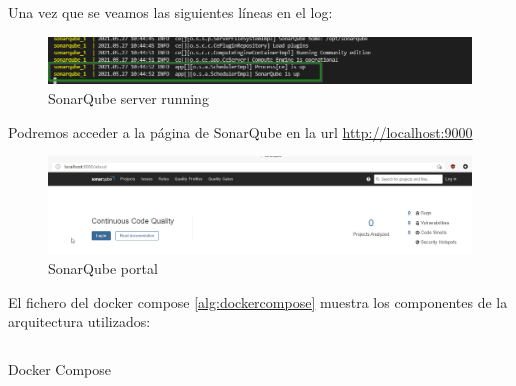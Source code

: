 \newpage
Una vez que se veamos las siguientes líneas en el log:\\
\begin{figure}[!htb] 
    \captionsetup{width=1\linewidth}   
    \includegraphics[width=\linewidth]{./imagenes/05_SonarQubeServerRunning.png}
    \caption{SonarQube server running}  
\end{figure}

Podremos acceder a la página de SonarQube en la url \href{http://localhost:9000}{http://localhost:9000}\\
\begin{figure}[!htb] 
    \captionsetup{width=1\linewidth}   
    \includegraphics[width=\linewidth]{./imagenes/06_SonarQubeServer_Webpage.png}
    \caption{SonarQube portal}  
    \label{fig:21}
\end{figure}

El fichero del docker compose \ref{alg:dockercompose} muestra los componentes de la arquitectura utilizados:\nopagebreak
\begin{listing}
    \centering
    \inputminted{yaml}{./EntornoPruebas/SonarQube_8.2/docker-compose.yml}
    \caption{Docker Compose}
    \label{alg:dockercompose}
\end{listing}
